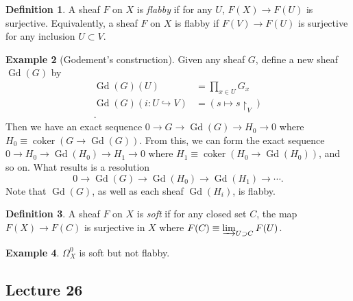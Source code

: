 \documentclass[10pt,letterpaper,cm]{nupset}
\theoremstyle{definition}
\newtheorem{definition}{Definition}[subsection]
\newtheorem{exmp}[definition]{Example}
\theoremstyle{theorem}
\theoremstyle{remark}
\newcommand{\1}{\mathbb{1}}
\newcommand{\0}{\vec 0}
\DeclareMathOperator{\Gd}{Gd}
\DeclareMathOperator{\coker}{coker}
\begin{document}
\begin{definition}
A sheaf $F$ on $X$ is \textit{flabby} if for any $U$, $F(X) \to F(U)$ is surjective. Equivalently, a sheaf $F$ on $X$ is flabby if $F(V) \to F(U)$ is surjective for any inclusion $U \subset V$.
\end{definition}

\begin{exmp}[Godement's construction]
Given any sheaf $G$, define a new sheaf $\Gd(G)$ by 
\begin{align*}
\Gd(G)(U) & =  \prod_{x\in U}G_x
\\
\Gd(G)(i : U \hookrightarrow V) & = (s \mapsto s \restriction_V)\\ 
.\end{align*} Then we have an exact sequence $0 \to G \to \Gd(G) \to H_0 \to 0$ where $H_0 \equiv \coker(G \to \Gd(G))$. From this, we can form the exact sequence $0 \to H_0 \to \Gd(H_0) \to H_1 \to 0$ where $H_1 \equiv \coker(H_0 \to \Gd(H_0))$, and so on. What results is a resolution $$ 0 \to \Gd(G) \to \Gd(H_0) \to \Gd(H_1) \to \cdots    .$$  Note that $\Gd(G)$, as well as each sheaf $\Gd(H_i)$, is flabby. 
\end{exmp}

\begin{definition}
A sheaf $F$ on $X$ is \textit{soft} if  for any closed set $C$, the map $F(X) \to F(C)$ is surjective in $X$ where $F(C) \equiv \varinjlim_{U \supset C}F(U)$. 
\end{definition}

\begin{exmp}
$\Omega^0_X$ is soft but not flabby. 
\end{exmp}

\subsection{Lecture 26}
\end{document}
